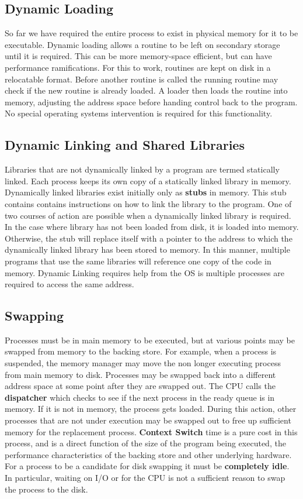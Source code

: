 \documentclass[10pt,a4paper]{article}
\begin{document}
\subsection{Dynamic Loading}
So far we have required the entire process to exist in physical memory for it to be executable. Dynamic loading allows a routine to be left on secondary storage until it is required. This can be more memory-space efficient, but can have performance ramifications. For this to work, routines are kept on disk in a relocatable format. Before another routine is called the running routine may check if the new routine is already loaded. A loader then loads the routine into memory, adjusting the address space before handing control back to the program. No special operating systems intervention is required for this functionality. 
\subsection{Dynamic Linking and Shared Libraries}
Libraries that are not dynamically linked by a program are termed statically linked. Each process keeps its own copy of a statically linked library in memory. Dynamically linked libraries exist initially only as {\bf stubs} in memory. This stub contains contains instructions on how to link the library to the program. One of two courses of action are possible when a dynamically linked library is required. In the case where library has not been loaded from disk, it is loaded into memory. Otherwise, the stub will replace itself with a pointer to the address to which the dynamically linked library has been stored to memory. In this manner, multiple programs that use the same libraries will reference one copy of the code in memory. Dynamic Linking requires help from the OS is multiple processes are required to access the same address. 
\subsection{Swapping}
Processes must be in main memory to be executed, but at various points may be swapped from memory to the backing store. For example, when a process is suspended, the memory manager may move the non longer executing process from main memory to disk. Processes may be swapped back into a different address space at some point after they are swapped out. The CPU calls the {\bf dispatcher} which checks to see if the next process in the ready queue is in memory. If it is not in memory, the process gets loaded. During this action, other processes that are not under execution may be swapped out to free up sufficient memory for the replacement process. {\bf Context Switch} time is a pure cost in this process, and is a direct function of the size of the program being executed, the performance characteristics of the backing store and other underlying hardware. For a process to be a candidate for disk swapping it must be {\bf completely idle}. In particular, waiting on I/O or for the CPU is not a sufficient reason to swap the process to the disk. 
\end{document}

